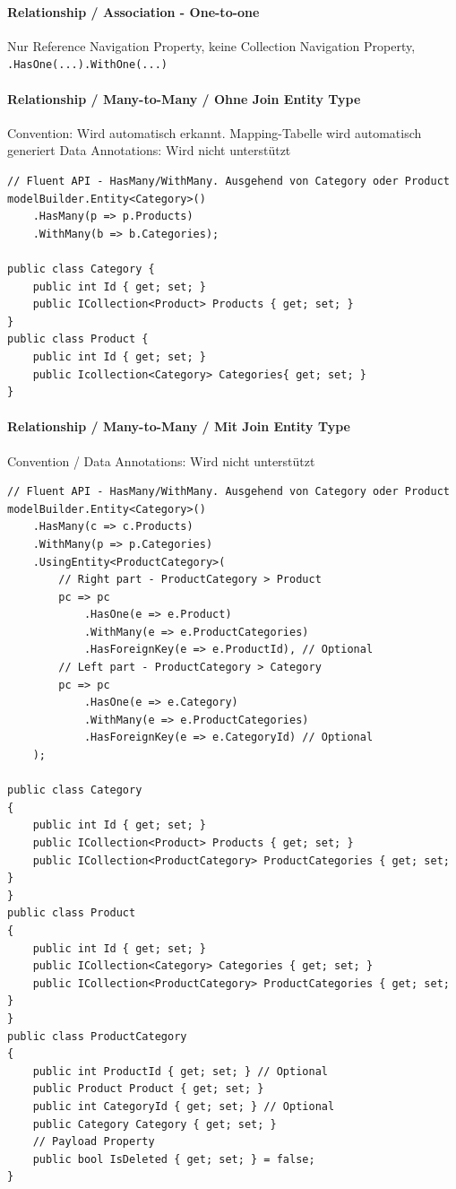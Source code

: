 \documentclass[
a4paper,
oneside,
10pt,
fleqn,
headsepline,
toc=listofnumbered, 
bibliography=totocnumbered]{scrartcl}
\begin{document}
\paragraph{Relationship / Association - One-to-one }
Nur Reference Navigation Property, keine Collection Navigation Property, \lstinline|.HasOne(...).WithOne(...)|

\paragraph{Relationship / Many-to-Many / Ohne Join Entity Type}
Convention: Wird automatisch erkannt. Mapping-Tabelle wird automatisch generiert
Data Annotations: Wird nicht unterstützt
\begin{lstlisting}
// Fluent API - HasMany/WithMany. Ausgehend von Category oder Product 
modelBuilder.Entity<Category>()
    .HasMany(p => p.Products)
    .WithMany(b => b.Categories);

public class Category {
    public int Id { get; set; }
    public ICollection<Product> Products { get; set; }
}
public class Product {
    public int Id { get; set; }
    public Icollection<Category> Categories{ get; set; }
}
\end{lstlisting}

\paragraph{Relationship / Many-to-Many / Mit Join Entity Type}
Convention / Data Annotations: Wird nicht unterstützt
\begin{lstlisting}
// Fluent API - HasMany/WithMany. Ausgehend von Category oder Product 
modelBuilder.Entity<Category>()
    .HasMany(c => c.Products)
    .WithMany(p => p.Categories)
    .UsingEntity<ProductCategory>(
        // Right part - ProductCategory > Product
        pc => pc
            .HasOne(e => e.Product)
            .WithMany(e => e.ProductCategories)
            .HasForeignKey(e => e.ProductId), // Optional
        // Left part - ProductCategory > Category
        pc => pc
            .HasOne(e => e.Category)
            .WithMany(e => e.ProductCategories)
            .HasForeignKey(e => e.CategoryId) // Optional
    );

public class Category
{
    public int Id { get; set; }
    public ICollection<Product> Products { get; set; }
    public ICollection<ProductCategory> ProductCategories { get; set; }
}
public class Product
{
    public int Id { get; set; }
    public ICollection<Category> Categories { get; set; }
    public ICollection<ProductCategory> ProductCategories { get; set; }
}
public class ProductCategory
{
    public int ProductId { get; set; } // Optional
    public Product Product { get; set; }
    public int CategoryId { get; set; } // Optional
    public Category Category { get; set; }
    // Payload Property
    public bool IsDeleted { get; set; } = false;
}
\end{lstlisting}
\end{document}
